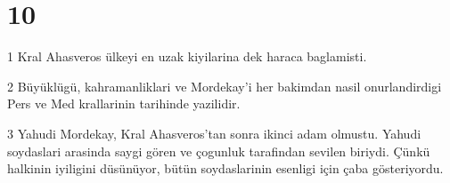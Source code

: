 \chapter{10}

\par 1 Kral Ahasveros ülkeyi en uzak kiyilarina dek haraca baglamisti.
\par 2 Büyüklügü, kahramanliklari ve Mordekay'i her bakimdan nasil onurlandirdigi Pers ve Med krallarinin tarihinde yazilidir.
\par 3 Yahudi Mordekay, Kral Ahasveros'tan sonra ikinci adam olmustu. Yahudi soydaslari arasinda saygi gören ve çogunluk tarafindan sevilen biriydi. Çünkü halkinin iyiligini düsünüyor, bütün soydaslarinin esenligi için çaba gösteriyordu.


